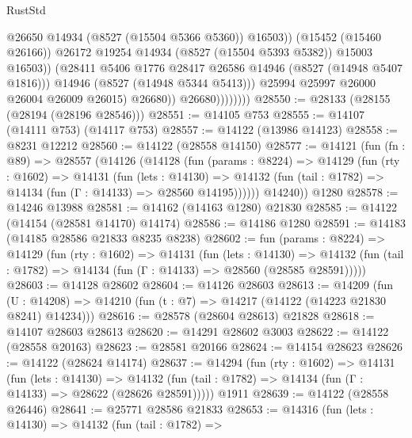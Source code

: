 \begin{lexlean}{RustStd}
\begin{coremodule}
                                    @26650
                                    @14934
                                    (@8527 (@15504 @5366 @5360))
                                    @16503))
                                (@15452 (@15460 @26166))
                                @26172
                                @19254
                                @14934
                                (@8527 (@15504 @5393 @5382))
                                @15003
                                @16503))
                            (@28411 @5406 @1776 @28417 @26586 @14946 (@8527 (@14948 @5407 @1816)))
                            @14946
                            (@8527 (@14948 @5344 @5413)))
                          @25994
                          @25997
                          @26000
                          @26004
                          @26009
                          @26015)
                        @26680))
                    @26680))))))))
@28550 := @28133 (@28155 (@28194 (@28196 @28546)))
@28551 := @14105 @753
@28555 := @14107 (@14111 @753) (@14117 @753)
@28557 := @14122 (@13986 @14123)
@28558 := @8231 @12212
@28560 := @14122 (@28558 @14150)
@28577 := @14121
    (fun (fn : @89) =>
    @28557
      (@14126
        (@14128
          (fun (params : @8224) =>
          @14129
            (fun (rty : @1602) =>
            @14131
              (fun (lets : @14130) =>
              @14132 (fun (tail : @1782) => @14134 (fun (Γ : @14133) => @28560 @14195))))))
        @14240))
    @1280
@28578 := @14246 @13988
@28581 := @14162 (@14163 @1280) @21830
@28585 := @14122 (@14154 (@28581 @14170) @14174)
@28586 := @14186 @1280
@28591 := @14183 (@14185 @28586 @21833 @8235 @8238)
@28602 := fun (params : @8224) =>
  @14129
    (fun (rty : @1602) =>
    @14131
      (fun (lets : @14130) =>
      @14132 (fun (tail : @1782) => @14134 (fun (Γ : @14133) => @28560 (@28585 @28591)))))
@28603 := @14128 @28602
@28604 := @14126 @28603
@28613 := @14209
    (fun (U : @14208) => @14210 (fun (t : @7) => @14217 (@14122 (@14223 @21830 @8241) @14234)))
@28616 := @28578 (@28604 @28613) @21828
@28618 := @14107 @28603 @28613
@28620 := @14291 @28602 @3003
@28622 := @14122 (@28558 @20163)
@28623 := @28581 @20166
@28624 := @14154 @28623
@28626 := @14122 (@28624 @14174)
@28637 := @14294
    (fun (rty : @1602) =>
    @14131
      (fun (lets : @14130) =>
      @14132 (fun (tail : @1782) => @14134 (fun (Γ : @14133) => @28622 (@28626 @28591)))))
    @1911
@28639 := @14122 (@28558 @26446)
@28641 := @25771 @28586 @21833
@28653 := @14316
    (fun (lets : @14130) =>
    @14132
      (fun (tail : @1782) =>

\end{coremodule}
\end{lexlean}
